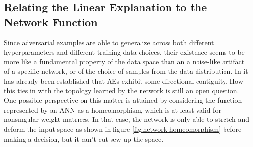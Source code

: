 \documentclass[11pt, a4paper]{article}
\begin{document}
\subsection{Relating the Linear Explanation to the Network Function}
Since adversarial examples are able to generalize across both different hyperparameters and different training data choices, their existence seems to be more like a fundamental property of the data space than an a noise-like artifact of a specific network, or of the choice of samples from the data distribution. In \cite{explaining-and-harnessing-adversarial-examples} it has already been established that AEs exhibit some directional contiguity. How this ties in with the topology learned by the network is still an open question. One possible perspective on this matter is attained by considering the function represented by an ANN as a homeomorphism, which is at least valid for nonsingular weight matrices. In that case, the network is only able to stretch and deform the input space as shown in figure \ref{fig:network-homeomorphism} before making a decision, but it can't cut sew up the space.
\end{document}
